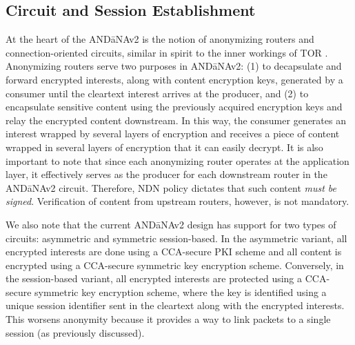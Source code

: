 \subsection{Circuit and Session Establishment}
At the heart of the {\sf AND\=aNAv2} is the notion of anonymizing routers and connection-oriented circuits, similar in spirit to the inner workings of TOR \cite{tor}. Anonymizing routers serve two purposes in {\sf AND\=aNAv2}: (1) to decapsulate and forward encrypted interests, along with content encryption keys, generated by a consumer until the cleartext interest arrives at the producer, and (2) to encapsulate sensitive content using the previously acquired encryption keys and relay the encrypted content downstream. In this way, the consumer generates an interest wrapped by several layers of encryption and receives a piece of content wrapped in several layers of encryption that it can easily decrypt. It is also important to note that since each anonymizing router operates at the application layer, it effectively serves as the producer for each downstream router in the {\sf AND\=aNAv2} circuit. Therefore, NDN policy dictates that such content \emph{must be signed}. Verification of content from upstream routers, however, is not mandatory. 

We also note that the current {\sf AND\=aNAv2} design has support for two types of circuits: asymmetric and symmetric session-based. In the asymmetric variant, all encrypted interests are done using a CCA-secure PKI scheme and all content is encrypted using a CCA-secure symmetric key encryption scheme. Conversely, in the session-based variant, all encrypted interests are protected using a CCA-secure symmetric key encryption scheme, where the key is identified using a unique session identifier sent in the cleartext along with the encrypted interests. This worsens anonymity because it provides a way to link packets to a single session (as previously discussed).

